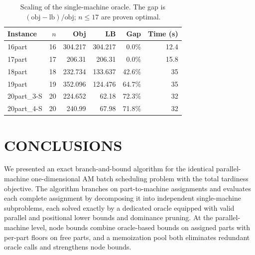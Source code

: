 \documentclass[letterpaper, 10 pt, conference]{ieeeconf}  %
\begin{document}
\begin{table}[t]
\centering
\caption{Scaling of the single-machine oracle. The gap is
$(\text{obj}-\text{lb})/\text{obj}$; $n\le 17$ are proven optimal.}
\label{tab:scale}
\begin{tabular}{l r r r r r}
\toprule
Instance & $n$ & Obj & LB & Gap & Time (s) \\
\midrule
16part      & 16 & 304.217 & 304.217 & 0.0\%  & 12.4 \\
17part      & 17 & 206.31  & 206.31  & 0.0\%  & 15.8 \\
18part      & 18 & 232.734 & 133.637 & 42.6\% & 35 \\
19part      & 19 & 352.096 & 124.476 & 64.7\% & 35 \\
20part\_3-S & 20 & 224.652 & 62.18   & 72.3\% & 32 \\
20part\_4-S & 20 & 240.99  & 67.98   & 71.8\% & 32 \\
\bottomrule
\end{tabular}
\end{table}

\section{CONCLUSIONS}


We presented an exact branch-and-bound algorithm for the identical
parallel-machine one-dimensional AM batch scheduling problem with the total
tardiness objective. The algorithm branches on part-to-machine assignments and
evaluates each complete assignment by decomposing it into independent
single-machine subproblems, each solved exactly by a dedicated oracle equipped
with valid parallel and positional lower bounds and dominance pruning. At the
parallel-machine level, node bounds combine oracle-based bounds on assigned
parts with per-part floors on free parts, and a memoization pool both eliminates
redundant oracle calls and strengthens node bounds.
\end{document}
